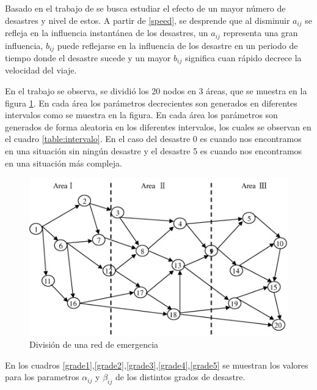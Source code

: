 \documentclass[letter, 10pt]{article}
\begin{document}
Basado en el trabajo de \cite{Yuan20091081} se busca estudiar el efecto de un mayor número de desastres y nivel de estos. A partir de \eqref{speed}, se desprende que al disminuir $a_{ij}$ se refleja en la influencia instantánea de los desastres, un  $a_{ij}$ representa una gran influencia, $b_{ij}$ puede reflejarse en la influencia de los desastre en un periodo de tiempo donde el desastre sucede y un mayor $b_{ij}$ significa cuan rápido decrece la velocidad del viaje.


En el trabajo \cite{Yuan20091081} se observa, se dividió los 20 nodos en 3 áreas, que se muestra en la figura \ref{area3}. En cada área los parámetros decrecientes son generados en diferentes intervalos como se muestra en la figura. En cada área los parámetros son generados de forma aleatoria en los diferentes intervalos, los cuales se observan en el cuadro \ref{table:intervalo}. En el caso del desastre 0 es cuando nos encontramos en una situación sin ningún desastre y el desastre 5 es cuando nos encontramos en una situación más compleja.

\begin{figure}[H]
\centering
\includegraphics[scale=1]{images/areas.jpg}
\caption{División de una red de emergencia}\label{area3}

\end{figure}

En los cuadros \ref{grade1},\ref{grade2},\ref{grade3},\ref{grade4},\ref{grade5} se muestran los valores para los parametros $\alpha_{ij}$ y $\beta_{ij}$	de los distintos grados de desastre.
\end{document}

